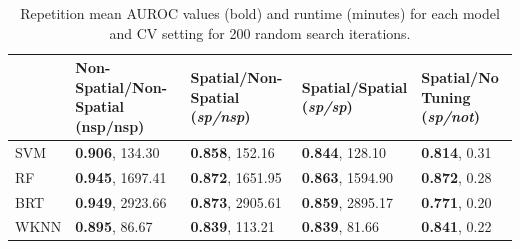 

\begin{table}[b!]
	\centering
	\caption[]{Repetition mean \ac{AUROC} values (bold) and runtime (minutes) for each model and \ac{CV} setting for 200 random search iterations.}
	\begingroup\footnotesize
	\begin{tabular}{lllll}
		\\
		          & \specialcell{Non-Spatial/Non-Spatial \\ {(nsp/nsp)}} & \specialcell{Spatial/Non-Spatial \\ {(\emph{sp/nsp})}} & \specialcell{Spatial/Spatial \\ {(\emph{sp/sp})}} & \specialcell{Spatial/No Tuning \\ {(\emph{sp/not})}} \\
		\hline
		\ac{SVM}  & \textbf{0.906}, 134.30                               & \textbf{0.858}, 152.16                                 & \textbf{0.844}, 128.10                            & \textbf{0.814}, 0.31 \\
		\ac{RF}   & \textbf{0.945}, 1697.41                              & \textbf{0.872}, 1651.95                                & \textbf{0.863}, 1594.90                           & \textbf{0.872}, 0.28 \\
		\ac{BRT}  & \textbf{0.949}, 2923.66                              & \textbf{0.873}, 2905.61                                & \textbf{0.859}, 2895.17                           & \textbf{0.771}, 0.20 \\
		\ac{WKNN} & \textbf{0.895}, 86.67                                & \textbf{0.839}, 113.21                                 & \textbf{0.839}, 81.66                             & \textbf{0.841}, 0.22 \\
		\bottomrule
	\end{tabular}
	\endgroup
	\label{tab:cv_results}
\end{table}
